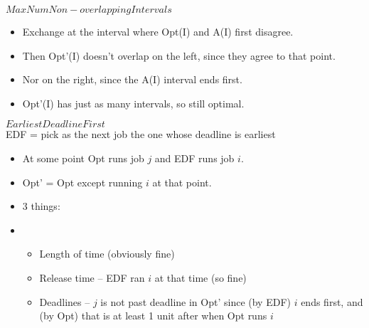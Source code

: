 \documentclass[12pt]{article}
\providecommand{\tightlist}{
    \setlength{\itemsep}{0pt}\setlength{\parskip}{0pt}
}
\begin{document}
$Max Num Non-overlapping Intervals$
\begin{itemize}
  \item Exchange at the interval where Opt(I) and A(I) first disagree.
  \item Then Opt'(I) doesn't overlap on the left, since they agree to that point.
  \item Nor on the right, since the A(I) interval ends first.
  \item Opt'(I) has just as many intervals, so still optimal.
\end{itemize}

$Earliest Deadline First$\\
EDF = pick as the next job the one whose deadline is earliest
\begin{itemize}\tightlist
  \item At some point Opt runs job $j$ and EDF runs job $i$.
  \item Opt' = Opt except running $i$ at that point.
  \item 3 things:
  \item \begin{itemize}\tightlist
    \item Length of time (obviously fine)
    \item Release time -- EDF ran $i$ at that time (so fine)
    \item Deadlines -- $j$ is not past deadline in Opt' since (by EDF) $i$ ends first, and (by Opt) that is at least 1 unit after when Opt runs $i$
  \end{itemize}
\end{itemize}
\end{document}

